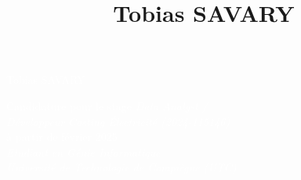 \documentclass[9pt, oneside, a4paper, titlepage]{extarticle}
\title{Tobias SAVARY}
\date{}
\begin{document}
    
    \begin{tcolorbox}
        \begin{minipage}{0.3\linewidth}
            \hspace*{1cm}
        \end{minipage}%
        \hspace{1cm}%
        \begin{minipage}{0.6\linewidth}
            \begin{center}
                \Huge{\textcolor{white}{Tobias SAVARY}} \\
                \vspace*{0.5cm}
                
                \Large{\textcolor{white}{Candidature pour le stage \emph{Data Analyst / \\ Développeur Costing Électricité (2024-115146)} \\ à partir de février 2025\\}}
                \vspace*{0.5cm}
                \Large{\textcolor{white}{\emph{Etudiant en Génie Informatique \\Université de Technologie de Compiègne (UTC) \\}}}
            \end{center}
        \end{minipage}%
    \end{tcolorbox}
\end{document}
